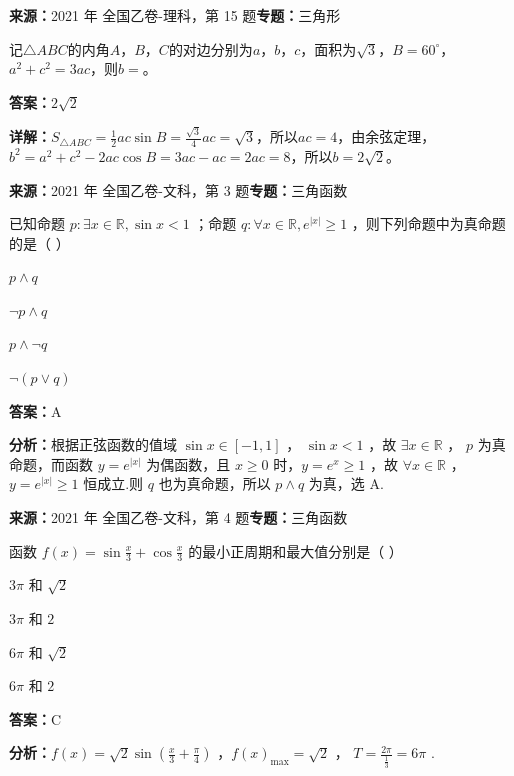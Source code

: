 \begin{question}[points=5]
\textbf{来源：}2021 年 全国乙卷-理科，第 15 题\quad \textbf{专题：}三角形\par
记$\triangle ABC$的内角$A$，$B$，$C$的对边分别为$a$，$b$，$c$，面积为$\sqrt{3}$，$B=60^\circ$，$a^2+c^2=3ac$，则$b=$。
\fillin[{$2\sqrt{2}$}]
\begin{solution}
\textbf{答案：}$2\sqrt{2}$

\textbf{详解：}$S_{\triangle ABC}=\frac12ac\sin B=\frac{\sqrt{3}}{4}ac=\sqrt{3}$，所以$ac=4$，由余弦定理，$b^2=a^2+c^2-2ac\cos B=3ac-ac=2ac=8$，所以$b=2\sqrt{2}$。
\end{solution}
\end{question}

\begin{question}[points=5]
\textbf{来源：}2021 年 全国乙卷-文科，第 3 题\quad \textbf{专题：}三角函数\par
已知命题 $p: \exists x \in \mathbb{R}, \sin x < 1$ ；命题 $q: \forall x \in \mathbb{R}, e^{|x|} \ge 1$ ，则下列命题中为真命题的是（ ）
\begin{choices}
  \item $p \land q$
  \item $\neg p \land q$
  \item $p \land \neg q$
  \item $\neg(p \lor q)$
\end{choices}
\begin{solution}
\textbf{答案：}A

\textbf{分析：}根据正弦函数的值域 $\sin x \in [-1,1]$ ， $\sin x < 1$ ，故 $\exists x \in \mathbb{R}$ ， $p$ 为真命题，而函数 $y = e^{|x|}$ 为偶函数，且 $x \ge 0$ 时，$y = e^x \ge 1$ ，故 $\forall x \in \mathbb{R}$ ， $y = e^{|x|} \ge 1$ 恒成立.则 $q$ 也为真命题，所以 $p \land q$ 为真，选 A.
\end{solution}
\end{question}

\begin{question}[points=5]
\textbf{来源：}2021 年 全国乙卷-文科，第 4 题\quad \textbf{专题：}三角函数\par
函数 $f(x) = \sin\frac{x}{3} + \cos\frac{x}{3}$ 的最小正周期和最大值分别是（ ）
\begin{choices}
  \item $3\pi$ 和 $\sqrt{2}$
  \item $3\pi$ 和 $2$
  \item $6\pi$ 和 $\sqrt{2}$
  \item $6\pi$ 和 $2$
\end{choices}
\begin{solution}
\textbf{答案：}C

\textbf{分析：}$f(x) = \sqrt{2}\sin\left(\frac{x}{3} + \frac{\pi}{4}\right)$ ，$f(x)_{\max} = \sqrt{2}$ ， $T = \frac{2\pi}{\frac{1}{3}} = 6\pi$ .
\end{solution}
\end{question}

